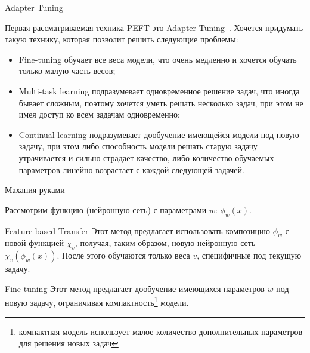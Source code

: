 \documentclass[9pt]{beamer}
\begin{document}
\begin{frame}{Adapter Tuning}

    Первая рассматриваемая техника PEFT это Adapter Tuning~\cite{adapter}. Хочется придумать такую технику, которая позволит решить следующие проблемы:
    
    \begin{itemize}
        \item Fine-tuning обучает все веса модели, что очень медленно и хочется обучать только малую часть весов;
        \item Multi-task learning подразумевает одновременное решение задач, что иногда бывает сложным, поэтому хочется уметь решать несколько задач, при этом не имея доступ ко всем задачам одновременно;
        \item Continual learning подразумевает дообучение имеющейся модели под новую задачу, при этом либо способность модели решать старую задачу утрачивается и сильно страдает качество, либо количество обучаемых параметров линейно возрастает с каждой следующей задачей.
    \end{itemize}

\end{frame}


\begin{frame}{Махания руками}

    Рассмотрим функцию (нейронную сеть) с параметрами $w$: $\phi_w(x)$.
    
    \begin{block}{Feature-based Transfer}
        Этот метод предлагает использовать композицию $\phi_w$ с новой функцией $\chi_v$, получая, таким образом, новую нейронную сеть $\chi_v(\phi_w(x))$. После этого обучаются только веса $v$, специфичные под текущую задачу.
    \end{block}

    \begin{block}{Fine-tuning}
        Этот метод предлагает дообучение имеющихся параметров $w$ под новую задачу, ограничивая компактность\footnote{компактная модель использует малое количество дополнительных параметров для решения новых задач} модели.
    \end{block}
    
\end{frame}
\end{document}
